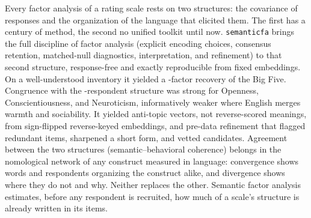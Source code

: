 
Every factor analysis of a rating scale rests on two structures: the
covariance of responses and the organization of the language that
elicited them. The first has a century of method, the second no unified toolkit until
now. \texttt{semanticfa} brings the full discipline of factor
analysis (explicit encoding choices, consensus retention, matched-null
diagnostics, interpretation, and refinement) to that second structure,
response-free and exactly reproducible from fixed embeddings. On a
well-understood inventory it yielded a \valConsensusKWord-factor recovery of the Big
Five. Congruence with the \valNHuman-respondent structure was strong for
Openness, Conscientiousness, and Neuroticism, informatively weaker where
English merges warmth and sociability. It yielded anti-topic vectors, not
reverse-scored meanings, from sign-flipped reverse-keyed embeddings, and
pre-data refinement that flagged redundant items, sharpened a short form,
and vetted candidates. Agreement between the two
structures (semantic--behavioral coherence) belongs in the nomological
network of any construct measured in language: convergence shows words and
respondents organizing the construct alike, and divergence shows where they do not
and why. Neither replaces the other. Semantic factor analysis estimates,
before any respondent is recruited, how much of a scale's structure is
already written in its items.
